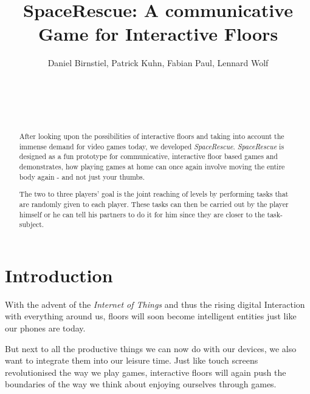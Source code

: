 \documentclass{sigchi}
\begin{document}
\title{SpaceRescue: A communicative Game for Interactive Floors}

\author{
  \alignauthor Daniel Birnstiel, Patrick Kuhn, Fabian Paul, Lennard Wolf\\
      \medskip
    \\
    \\
    \\
    \\
}

\maketitle

\begin{abstract}
\vspace{1mm}
After looking upon the possibilities of interactive floors and taking into account the immense demand for video games today, we developed \textit{SpaceRescue}. \textit{SpaceRescue} is designed as a fun prototype for communicative, interactive floor based games and demonstrates, how playing games at home can once again involve moving the entire body
again - and not just your thumbs.


The two to three players' goal is the joint reaching of levels by performing tasks that are randomly given to each player. These tasks can then be carried out by the player himself or he can tell his partners to do it for him since they are closer to the task-subject. 

\end{abstract}


\section{Introduction}
\vspace{1mm}
With the advent of the \textit{Internet of Things} and thus the rising digital Interaction with everything around us, floors will soon become intelligent entities just like our phones are today. 

But next to all the productive things we can now do with our devices, we also want to integrate them into our leisure time. Just like touch screens revolutionised the way we play games, interactive floors will again push the boundaries of the way we think about enjoying ourselves through games.
\end{document}
